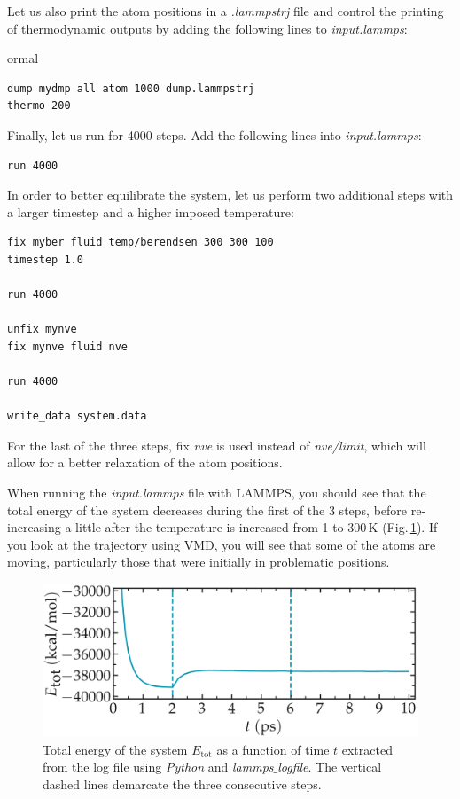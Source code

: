 \documentclass[9pt,tutorial]{livecoms}
\begin{document}
Let us also print the atom positions in a \textit{.lammpstrj} file and control the printing of thermodynamic outputs by adding the following lines to \textit{input.lammps}:
{
ormal \begin{verbatim}
dump mydmp all atom 1000 dump.lammpstrj
thermo 200
\end{verbatim}}
Finally, let us run for 4000 steps. Add the  following lines into \textit{input.lammps}:
{\normalsize \begin{verbatim}
run 4000
\end{verbatim}}
In order to better equilibrate the system, let us perform two additional steps with a larger timestep and a higher imposed temperature:
{\normalsize \begin{verbatim}
fix myber fluid temp/berendsen 300 300 100
timestep 1.0

run 4000

unfix mynve
fix mynve fluid nve

run 4000

write_data system.data
\end{verbatim}}
For the last of the three steps, fix \textit{nve} is used instead of \textit{nve/limit}, which will allow for a better relaxation of the atom positions. 

When running the \textit{input.lammps} file with LAMMPS, you should see that the total energy of the system decreases during the first of the 3 steps, before re-increasing a little after the temperature is increased from 1 to $300\,\text{K}$ (Fig.\,\ref{fig:NANOSHEAR-minimization}). If you look at the trajectory using VMD, you will see that some of the atoms are moving, particularly those that were initially in problematic positions. 

\begin{figure}
\centering
\includegraphics[width=\linewidth]{NANOSHEAR-minimization}
\caption{Total energy of the system $E_\text{tot}$ as a function of time $t$ extracted from the log file using \textit{Python} and \textit{lammps$\_$logfile}. The vertical dashed lines demarcate the three consecutive steps.}
\label{fig:NANOSHEAR-minimization}
\end{figure}
\end{document}
